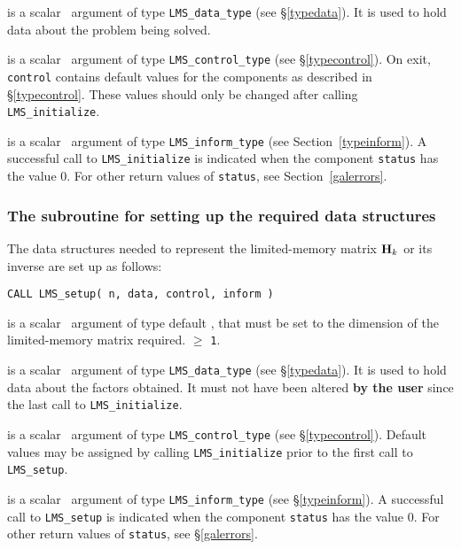 \documentclass{galahad}
\newcommand{\packagename}{LMS}
\begin{document}
\vspace*{-3mm}
\begin{description}

 is a scalar \intentinout\ argument of type
{\tt \packagename\_data\_type}
(see \S\ref{typedata}). It is used to hold data about the problem being
solved.

 is a scalar \intentout\ argument of type
{\tt \packagename\_control\_type}
(see \S\ref{typecontrol}).
On exit, {\tt control} contains default values for the components as
described in \S\ref{typecontrol}.
These values should only be changed after calling
{\tt \packagename\_initialize}.

 is a scalar \intentout\ argument of type
{\tt \packagename\_inform\_type}
(see Section~\ref{typeinform}). A successful call to
{\tt \packagename\_initialize}
is indicated when the  component {\tt status} has the value 0.
For other return values of {\tt status}, see Section~\ref{galerrors}.

\end{description}


\subsubsection{The subroutine for setting up the required data structures}
The data structures needed to represent the limited-memory matrix ${\mathbf{H}}_k$
or its inverse are set up as follows:
\vspace*{1mm}

\hspace{8mm}
{\tt CALL \packagename\_setup(  n, data, control, inform )}

\vspace*{-3mm}
\begin{description}
 is a scalar \intentin\ argument of type default \integer,
that must be set to the dimension of the limited-memory matrix required.
 $\geq$ {\tt 1}.

 is a scalar \intentinout\ argument of type
{\tt \packagename\_data\_type}
(see \S\ref{typedata}). It is used to hold data about the factors obtained.
It must not have been altered {\bf by the user} since the last call to
{\tt \packagename\_initialize}.

 is a scalar \intentin\ argument of type
{\tt \packagename\_control\_type}
(see \S\ref{typecontrol}). Default values may be assigned by calling
{\tt \packagename\_initialize} prior to the first call to
{\tt \packagename\_setup}.

 is a scalar \intentout\ argument of type
{\tt \packagename\_inform\_type}
(see \S\ref{typeinform}). A successful call to
{\tt \packagename\_setup}
is indicated when the  component {\tt status} has the value 0.
For other return values of {\tt status}, see \S\ref{galerrors}.

\end{description}
\end{document}
